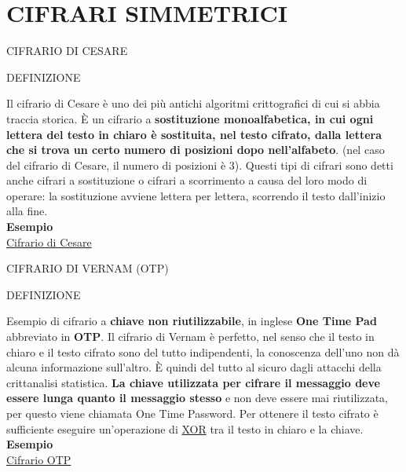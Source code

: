 \documentclass[aspectratio=1610]{beamer}
\begin{document}
\section{CIFRARI SIMMETRICI}

\begin{frame}{CIFRARIO DI CESARE}
    \begin{alertblock}{DEFINIZIONE}
        \begin{minipage}{0.98\linewidth}
            \justifying
            Il cifrario di Cesare è uno dei più antichi algoritmi crittografici di cui si abbia traccia storica. 
            È un cifrario a \textbf{sostituzione monoalfabetica, in cui ogni lettera del testo in chiaro è sostituita, 
            nel testo cifrato, dalla lettera che si trova un certo numero di posizioni dopo nell'alfabeto}. 
            (nel caso del cifrario di Cesare, il numero di posizioni è 3). Questi tipi di cifrari sono detti anche 
            cifrari a sostituzione o cifrari a scorrimento a causa del loro modo di operare: la sostituzione avviene 
            lettera per lettera, scorrendo il testo dall'inizio alla fine.\\
            \bigskip
            \tiny{\textbf{Esempio}}\\
            \tiny{\href{http://www.crittologia.eu/critto/caesar.html}{Cifrario di Cesare}}
        \end{minipage}
    \end{alertblock}
\end{frame}

\begin{frame}{CIFRARIO DI VERNAM (OTP)}
    \begin{alertblock}{DEFINIZIONE}
        \begin{minipage}{0.98\linewidth}
            \justifying
            Esempio di cifrario a \textbf{chiave non riutilizzabile}, in inglese \textbf{One Time Pad} abbreviato in \textbf{OTP}. 
            Il cifrario di Vernam è perfetto, nel senso che il testo in chiaro e il testo cifrato sono del tutto indipendenti, 
            la conoscenza dell'uno non dà alcuna informazione sull'altro. È quindi del tutto al sicuro dagli attacchi della crittanalisi statistica. 
            \textbf{La chiave utilizzata per cifrare il messaggio deve essere lunga quanto il messaggio stesso} e non deve 
            essere mai riutilizzata, per questo viene chiamata One Time Password. Per ottenere il testo cifrato è sufficiente 
            eseguire un'operazione di \href{https://it.wikipedia.org/wiki/Disgiunzione\_esclusiva}{XOR} tra il testo in chiaro 
            e la chiave.\\
            \bigskip
            \tiny{\textbf{Esempio}}\\
            \tiny{\href{http://www.crittologia.eu/critto/vernam.phtml}{Cifrario OTP}}
        \end{minipage}
    \end{alertblock}
\end{frame}
\end{document}
